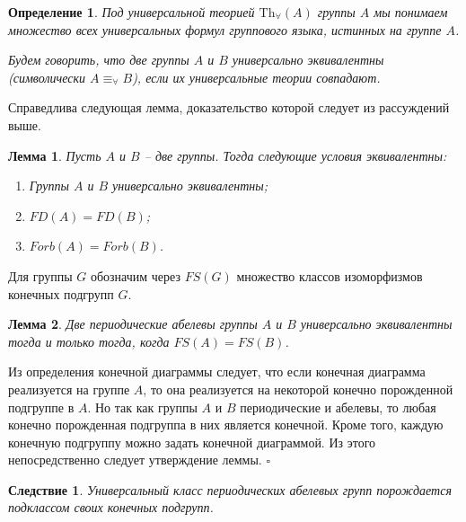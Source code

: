 \documentclass[a4paper,11pt,twoside]{article}
\newtheorem{lemma}{Лемма}[section]
\newtheorem{corollary}{Следствие}[section]
\newtheorem{definition}{Определение}[section]
\def\proof{{\noindent{\bf Доказательство.}} }
\def\Tha{{\mathrm{Th}_\forall}}
\begin{document}
\begin{definition}
Под универсальной теорией $\Tha(A)$ группы $A$ мы понимаем множество всех универсальных формул группового языка, истинных на группе $A$. 

Будем говорить, что две группы $A$ и $B$ универсально эквивалентны (символически $A \equiv_\forall B$), если их универсальные теории совпадают. 
\end{definition}
Справедлива следующая лемма, доказательство которой следует из рассуждений выше.

\begin{lemma}\label{lemma:UnivEquivForb}
Пусть $A$ и $B$ -- две группы. Тогда следующие условия эквивалентны:
\begin{enumerate}
\item Группы $A$ и $B$ универсально эквивалентны;
\item $FD(A) = FD(B)$;
\item $Forb(A) = Forb(B)$.
\end{enumerate}
\end{lemma}

Для группы $G$ обозначим через $FS(G)$ множество классов изоморфизмов конечных подгрупп $G$.

\begin{lemma}\label{lemma:UnivEquivFS}
Две периодические абелевы группы $A$ и $B$ универсально эквивалентны тогда и только тогда, когда $FS(A) = FS(B)$.
\end{lemma}
\proof Из определения конечной диаграммы следует, что если конечная диаграмма реализуется на группе $A$, то она реализуется на некоторой конечно порожденной подгруппе в $A$. Но так как группы $A$ и $B$ периодические и абелевы, то любая конечно порожденная подгруппа в них является конечной. Кроме того, каждую конечную подгруппу можно задать конечной диаграммой. Из этого непосредственно следует утверждение леммы. $\square$

\begin{corollary}\label{cor:ClassPerdiodicAbelinaGroup}
Универсальный класс периодических абелевых групп порождается подклассом своих конечных подгрупп.
\end{corollary}
\end{document}
